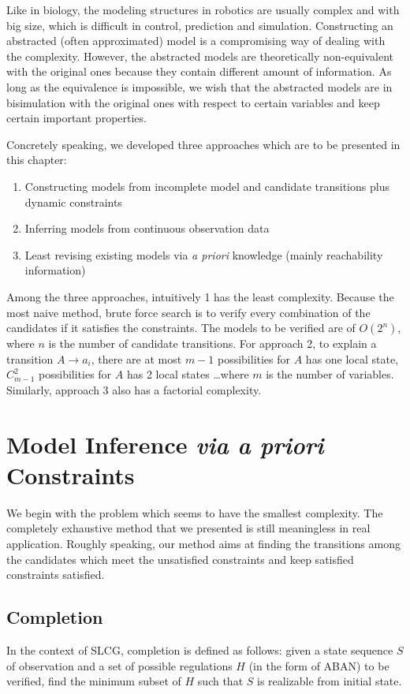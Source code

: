 Like in biology, the modeling structures in robotics are usually complex and with big size, which is difficult in control, prediction and simulation.
Constructing an abstracted (often approximated) model is a compromising way of dealing with the complexity.
However, the abstracted models are theoretically non-equivalent with the original ones because they contain different amount of information.
As long as the equivalence is impossible, we wish that the abstracted models are in bisimulation with the original ones with respect to certain variables and keep certain important properties.

Concretely speaking, we developed three approaches which are to be presented in this chapter:

\begin{enumerate}
    \item Constructing models from incomplete model and candidate transitions plus dynamic constraints
    \item Inferring models from continuous observation data
    \item Least revising existing models via \textit{a priori} knowledge (mainly reachability information)
\end{enumerate}

Among the three approaches, intuitively 1 has the least complexity. 
Because the most naive method, brute force search is to verify every combination of the candidates if it satisfies the constraints. 
The models to be verified are of $O(2^n)$, where $n$ is the number of candidate transitions.
For approach 2, to explain a transition $A\to a_i$, there are at most $m-1$ possibilities for $A$ has one local state, $C_{m-1}^2$ possibilities for $A$ has 2 local states \ldots where $m$ is the number of variables.
Similarly, approach 3 also has a factorial complexity.

\section{Model Inference \textit{via a priori} Constraints}
We begin with the problem which seems to have the smallest complexity.
The completely exhaustive method that we presented is still meaningless in real application.
Roughly speaking, our method aims at finding the transitions among the candidates which meet the unsatisfied constraints and keep satisfied constraints satisfied.

\subsection{Completion}
In the context of SLCG, completion is defined as follows: given a state sequence $S$ of observation and a set of possible regulations $H$ (in the form of ABAN) to be verified,  find the minimum subset of $H$ such that $S$ is realizable from initial state. 
